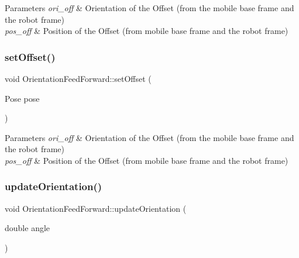 \begin{DoxyParams}{Parameters}
{\em ori\+\_\+off} & Orientation of the Offset (from the mobile base frame and the robot frame) \\
\hline
{\em pos\+\_\+off} & Position of the Offset (from mobile base frame and the robot frame) \\
\hline
\end{DoxyParams}
\mbox{\label{classOrientationFeedForward_adbd1691b1e930752818624d065acbf1c}} 
\subsubsection{\texorpdfstring{set\+Offset()}{setOffset()}\hspace{0.1cm}{\footnotesize\ttfamily [2/2]}}
{\footnotesize\ttfamily void Orientation\+Feed\+Forward\+::set\+Offset (\begin{DoxyParamCaption}\item[{Pose}]{pose }\end{DoxyParamCaption})}


\begin{DoxyParams}{Parameters}
{\em ori\+\_\+off} & Orientation of the Offset (from the mobile base frame and the robot frame) \\
\hline
{\em pos\+\_\+off} & Position of the Offset (from mobile base frame and the robot frame) \\
\hline
\end{DoxyParams}
\mbox{\label{classOrientationFeedForward_aa7d8913f8f9d90e913b478d9adc5ff20}} 
\subsubsection{\texorpdfstring{update\+Orientation()}{updateOrientation()}\hspace{0.1cm}{\footnotesize\ttfamily [1/2]}}
{\footnotesize\ttfamily void Orientation\+Feed\+Forward\+::update\+Orientation (\begin{DoxyParamCaption}\item[{double}]{angle }\end{DoxyParamCaption})}


